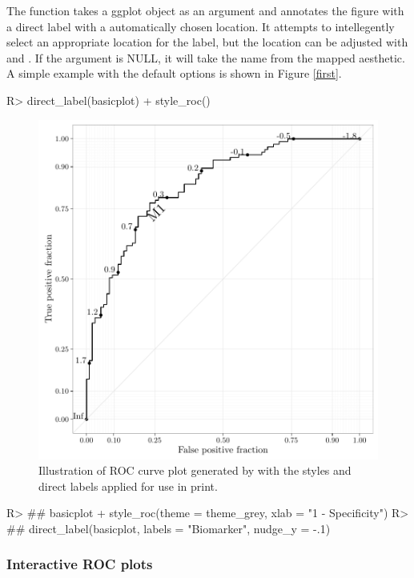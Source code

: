\documentclass[codesnippet]{jss}
\begin{document}
The  function takes a ggplot object as an argument
and annotates the figure with a direct label with a automatically chosen
location. It attempts to intellegently select an appropriate location
for the label, but the location can be adjusted with
 and . If the 
argument is NULL, it will take the name from the mapped aesthetic. A
simple example with the default options is shown in Figure \ref{first}.

\begin{Schunk}
\begin{Sinput}
R> direct_label(basicplot) + style_roc()
\end{Sinput}
\begin{figure}
\includegraphics{figure/print-1} \caption{Illustration of ROC curve plot generated by  with the styles and direct labels applied for use in print. \label{first}}\label{fig:print}
\end{figure}
\begin{Sinput}
R> ## basicplot + style_roc(theme = theme_grey, xlab = "1 - Specificity")
R> ## direct_label(basicplot, labels = "Biomarker", nudge_y = -.1)
\end{Sinput}
\end{Schunk}

\subsubsection{Interactive ROC plots}\label{interactive-roc-plots}
\end{document}
